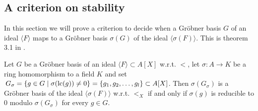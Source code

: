 \subsection{A criterion on stability}
In this section we will prove a criterion to decide when a Gröbner basis $G$ of an ideal $\langle F \rangle$ maps to a Gröbner basis $\sigma(G)$ of the ideal $\langle \sigma(F) \rangle$. This is theorem 3.1 in \cite{Kalkbrener}.

\begin{lemma}\label{lem:grb_iff_reduc_to_z}
  Let $G$ be a Gröbner basis of an ideal $\langle F \rangle \subset A[X]$ w.r.t. $<$, let $\sigma : A \to K$ be a ring homomorphism to a field $K$ and set $\,G_{\sigma} = \{g \in G \mid \sigma(\operatorname{lc}(g)) \neq 0\} = \{g_{1}, g_{2}, \dots, g_{l}\} \subset A[X]$. Then $\sigma(G_{\sigma})$ is a Gröbner basis of the ideal $\langle \sigma(F) \rangle$ w.r.t. $<_{X}$ if and only if $\sigma(g)$ is reducible to 0 modulo $\sigma(G_{\sigma})$ for every $g \in G$.
\end{lemma}
